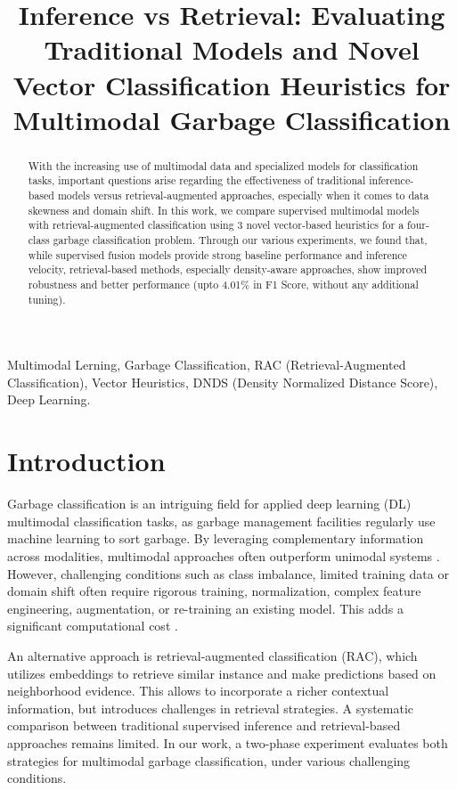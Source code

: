 \documentclass{article}
\title{Inference vs Retrieval: Evaluating Traditional Models and Novel Vector Classification Heuristics for Multimodal Garbage Classification}
\begin{document}

\maketitle
%
\begin{abstract}

With the increasing use of multimodal data and specialized models for classification tasks, important questions arise regarding the effectiveness of traditional inference-based models versus retrieval-augmented approaches, especially when it comes to data skewness and domain shift. In this work, we compare supervised multimodal models with retrieval-augmented classification using 3 novel vector-based heuristics for a four-class garbage classification problem. Through our various experiments, we found that, while supervised fusion models provide strong baseline performance and inference velocity, retrieval-based methods, especially density-aware approaches, show improved robustness and better performance (upto 4.01\% in F1 Score, without any additional tuning).

\end{abstract}
%
\begin{keywords}
Multimodal Lerning, Garbage Classification, RAC (Retrieval-Augmented Classification), Vector Heuristics, DNDS (Density Normalized Distance Score), Deep Learning.
\end{keywords}
%

\section{Introduction}
\label{sec:intro}

Garbage classification is an intriguing field for applied deep learning (DL) multimodal classification tasks, as garbage management facilities regularly use machine learning \cite{alexakis2025enhanced} to sort garbage. By leveraging complementary information across modalities, multimodal approaches often outperform unimodal systems \cite{alexakis2025enhanced}. However, challenging conditions such as class imbalance, limited training data or domain shift often require rigorous training, normalization, complex feature engineering, augmentation, or re-training an existing model. This adds a significant computational cost \cite{islam2026learning}.

An alternative approach is retrieval-augmented classification (RAC), which utilizes embeddings to retrieve similar instance and make predictions based on neighborhood evidence. This allows to incorporate a richer contextual information, but introduces challenges in retrieval strategies. A systematic comparison between traditional supervised inference and retrieval-based approaches remains limited. In our work, a two-phase experiment evaluates both strategies for multimodal garbage classification, under various challenging conditions. 
\end{document}
